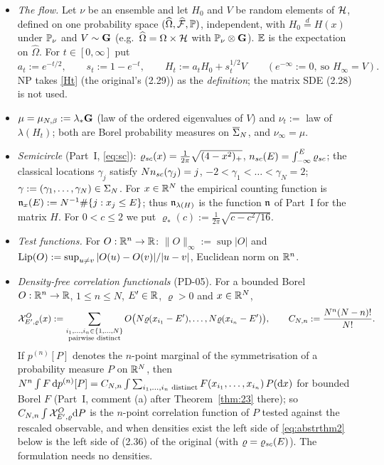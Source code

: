 \begin{itemize}[leftmargin=1.6em,itemsep=2pt]
(so $\E|v_{ij}|^2=1/N$, and $\E v_{ij}^2=0$ if $\beta=2$). This is the GOE ($\beta=1$, diagonal variance $2/N$; PD-06) resp.\ the GUE ($\beta=2$), exactly the matrix $V$ of the setting of Theorem~\ref{thm:23} in Part~I.
$V$ always denotes a $\bG$-distributed matrix. We put $\tau_{ij}^2:=\E|v_{ij}|^2$, i.e.\ $\tau_{ij}^2=1/N$ ($i\ne j$), $\tau_{ii}^2=2/(\beta N)$.
\item \emph{The flow.} Let $\nu$ be an ensemble and let $H_0$ and $V$ be random elements of $\cH$, defined on one probability space $(\widehat\Omega,\widehat{\mathcal F},\P)$, independent, with $H_0\overset{d}=H(x)$ under $\PP_\nu$ and $V\sim\bG$ (e.g.\ $\widehat\Omega=\Omega\times\cH$ with $\PP_\nu\otimes\bG$). $\E$ is the expectation on $\widehat\Omega$. For $t\in[0,\infty]$ put
\begin{equation}\label{Ht}
a_t:=e^{-t/2},\qquad s_t:=1-e^{-t},\qquad H_t:=a_tH_0+s_t^{1/2}V\qquad(e^{-\infty}:=0,\ \text{so }H_\infty=V).
\end{equation}
NP takes \eqref{Ht} (the original's (2.29)) as the \emph{definition}; the matrix SDE (2.28) is not used.
\item $\mu=\mu_{N,\beta}:=\lambda_*\bG$ (law of the ordered eigenvalues of $V$) and $\nu_t:=$ law of $\lambda(H_t)$; both are Borel probability measures on $\cSig$, and $\nu_\infty=\mu$.
\item \emph{Semicircle} (Part~I, \eqref{eq:sc}): $\rhosc(x)=\frac1{2\pi}\sqrt{(4-x^2)_+}$, $\nsc(E)=\int_{-\infty}^E\rhosc$; the classical locations $\gamma_j$ satisfy $N\nsc(\gamma_j)=j$, $-2<\gamma_1<\dots<\gamma_N=2$; $\gamma:=(\gamma_1,\dots,\gamma_N)\in\Sig$.
For $x\in\R^N$ the empirical counting function is $\fn_x(E):=N^{-1}\#\{j:x_j\le E\}$; thus $\fn_{\lambda(H)}$ is the function $\fn$ of Part~I for the matrix $H$.
For $0<c\le2$ we put $\varrho_*(c):=\frac1{2\pi}\sqrt{c-c^2/16}$.
\item \emph{Test functions.} For $O:\R^n\to\R$: $\|O\|_\infty:=\sup|O|$ and $\Lip(O):=\sup_{u\ne v}|O(u)-O(v)|/|u-v|$, Euclidean norm on $\R^n$.
\item \emph{Density-free correlation functionals} (PD-05). For a bounded Borel $O:\R^n\to\R$, $1\le n\le N$, $E'\in\R$, $\varrho>0$ and $x\in\R^N$,
\begin{equation}\label{defX}
\cX^{O}_{E',\varrho}(x):=\sum_{\substack{i_1,\dots,i_n\in\{1,\dots,N\}\\ \text{pairwise distinct}}}O\big(N\varrho(x_{i_1}-E'),\dots,N\varrho(x_{i_n}-E')\big),\qquad C_{N,n}:=\frac{N^n(N-n)!}{N!}.
\end{equation}
If $p^{(n)}[P]$ denotes the $n$-point marginal of the symmetrisation of a probability measure $P$ on $\R^N$, then $N^n\int F\,\rd p^{(n)}[P]=C_{N,n}\int\sum_{i_1,\dots,i_n\text{ distinct}}F(x_{i_1},\dots,x_{i_n})\,P(\rd x)$ for bounded Borel $F$
(Part~I, comment (a) after Theorem~\ref{thm:23} there); so $C_{N,n}\int\cX^O_{E',\varrho}\rd P$ is the $n$-point correlation function of $P$ tested against the rescaled observable, and when densities exist the left side of \eqref{eq:abstrthm2} below is the left side of (2.36) of the original (with $\varrho=\rhosc(E)$). The formulation needs no densities.
\end{itemize}

